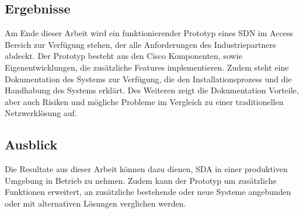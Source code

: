 \subsection{Ergebnisse}
Am Ende dieser Arbeit wird ein funktionierender Prototyp eines SDN im Access Bereich zur Verfügung stehen, der alle Anforderungen des Industriepartners abdeckt. Der Prototyp besteht aus den Cisco Komponenten, sowie Eigenentwicklungen, die zusätzliche Features implementieren. 
Zudem steht eine Dokumentation des Systems zur Verfügung, die den Installationsprozess und die Handhabung des Systems erklärt. Des Weiteren zeigt die Dokumentation Vorteile, aber auch Risiken und mögliche Probleme im Vergleich zu einer traditionellen Netzwerklösung auf.
\subsection{Ausblick}
Die Resultate aus dieser Arbeit können dazu dienen, SDA in einer produktiven Umgebung in Betrieb zu nehmen. Zudem kann der Prototyp um zusätzliche Funktionen erweitert, an zusätzliche bestehende oder neue Systeme angebunden oder mit alternativen Lösungen verglichen werden.
